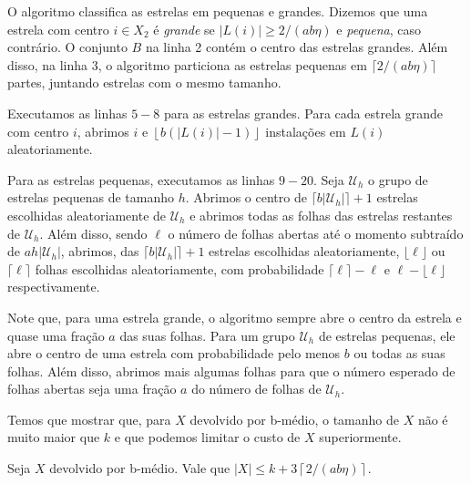 O algoritmo classifica as estrelas em pequenas e grandes. Dizemos que uma estrela com centro $i \in X_2$ é \emph{grande} se $|L(i)| \geq 2/(ab\eta)$ e \emph{pequena}, caso contrário. O conjunto $B$ na linha 2 contém o centro das estrelas grandes. Além disso, na linha 3, o algoritmo particiona as estrelas pequenas em $\lceil 2/(ab\eta)\rceil$ partes, juntando estrelas com o mesmo tamanho.

Executamos as linhas $5-8$ para as estrelas grandes. Para cada estrela grande com centro $i$, abrimos $i$ e $\left \lfloor b (|L(i)| - 1) \right \rfloor$ instalações em $L(i)$ aleatoriamente.

Para as estrelas pequenas, executamos as linhas $9-20$. Seja $\mathcal{U}_h$ o grupo de estrelas pequenas de tamanho $h$. Abrimos o centro de $\lceil b |\mathcal{U}_h| \rceil + 1$ estrelas escolhidas aleatoriamente de $\mathcal{U}_h$ e abrimos todas as folhas das estrelas restantes de $\mathcal{U}_h$. Além disso, sendo $\ell$ o número de folhas abertas até o momento subtraído de $ah|\mathcal{U}_h|$, abrimos, das $\lceil b |\mathcal{U}_h| \rceil + 1$ estrelas escolhidas aleatoriamente, $\lfloor \ell \rfloor$ ou $\lceil \ell \rceil$ folhas escolhidas aleatoriamente, com probabilidade $\lceil \ell \rceil - \ell$ e $\ell - \lfloor \ell \rfloor$ respectivamente.

Note que, para uma estrela grande, o algoritmo sempre abre o centro da estrela e quase uma fração $a$ das suas folhas. Para um grupo $\mathcal{U}_h$ de estrelas pequenas, ele abre o centro de uma estrela com probabilidade pelo menos $b$ ou todas as suas folhas. Além disso, abrimos mais algumas folhas para que o número esperado de folhas abertas seja uma fração $a$ do número de folhas de $\mathcal{U}_h$.

Temos que mostrar que, para $X$ devolvido por {\sc b-médio}, o tamanho de $X$ não é muito maior que $k$ e que podemos limitar o custo de $X$ superiormente.
\begin{lemma}
    Seja $X$ devolvido por {\sc b-médio}. Vale que 
    \(|X| \leq k + 3 \left \lceil 2/(ab\eta) \right \rceil\).
\end{lemma}

